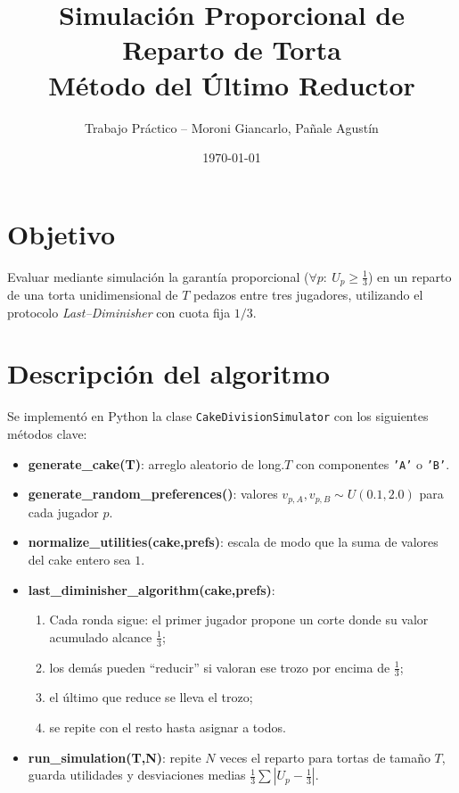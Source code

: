 \documentclass[11pt,a4paper]{article}
\title{\textbf{Simulación Proporcional de Reparto de Torta\\
Método del Último Reductor}}
\author{Trabajo Práctico – Moroni Giancarlo, Pañale Agustín}
\date{\today}
\begin{document}
\maketitle

\section{Objetivo}
Evaluar mediante simulación la garantía proporcional
(\(\forall p:\ U_p \ge \tfrac13\)) en un reparto de una torta
unidimensional de \(T\) pedazos entre tres jugadores,
utilizando el protocolo \emph{Last–Diminisher} con cuota fija \(1/3\).

\section{Descripción del algoritmo}
Se implementó en Python la clase \texttt{CakeDivisionSimulator}
con los siguientes métodos clave:
\begin{itemize}
  \item \textbf{generate\_cake(T)}: arreglo aleatorio de long.\(T\)
        con componentes \texttt{'A'} o \texttt{'B'}.
  \item \textbf{generate\_random\_preferences()}: valores
        \(v_{p,A},v_{p,B}\sim U(0.1,2.0)\) para cada jugador \(p\).
  \item \textbf{normalize\_utilities(cake,prefs)}: escala de modo
        que la suma de valores del cake entero sea \(1\).
  \item \textbf{last\_diminisher\_algorithm(cake,prefs)}:
        \begin{enumerate}
          \item Cada ronda sigue: el primer jugador propone un
                corte donde su valor acumulado alcance \(\tfrac13\);
          \item los demás pueden “reducir” si valoran ese trozo
                por encima de \(\tfrac13\);
          \item el último que reduce se lleva el trozo;
          \item se repite con el resto hasta asignar a todos.
        \end{enumerate}
  \item \textbf{run\_simulation(T,N)}: repite \(N\) veces
        el reparto para tortas de tamaño \(T\), guarda utilidades
        y desviaciones medias \(\frac{1}{3}\sum|U_p-\tfrac13|\).
\end{itemize}
\end{document}
